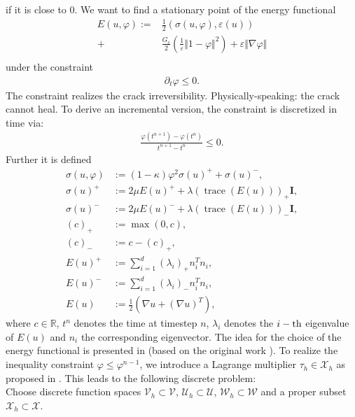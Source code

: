 if it is close to $0$.
We want to find a stationary point of the energy functional
\begin{align*}
E(u, \varphi):=& \frac{1}{2}(\sigma(u,\varphi),\varepsilon(u)) \\
+&\frac{G_c}{2}(\frac{1}{\varepsilon} \Vert 1 - \varphi \Vert^2)+\varepsilon \Vert \nabla \varphi  \Vert\\
\end{align*}
under the constraint 
\begin{align*}
\partial_t \varphi \leq 0.
 \end{align*}
The constraint realizes the crack irreversibility. Physically-speaking: the
crack cannot heal. To derive an incremental version, the constraint is discretized in time via:
\begin{align*}
 \frac{\varphi(t^{n+1})-\varphi(t^n)}{t^{n+1}-t^n} \leq 0.
\end{align*}
Further it is defined
\begin{align*}
\sigma(u,\varphi)&:= (1-\kappa)\varphi^2 \sigma(u)^+ + \sigma(u)^-,\\
\sigma(u)^+ &:= 2\mu E(u)^+ +\lambda (\operatorname{trace}(E(u)))_+ \textbf{I},\\
\sigma(u)^- &:= 2\mu E(u)^- +\lambda (\operatorname{trace}(E(u)))_- \textbf{I},\\
(c)_+ &:= \max(0, c), \\
(c)_- &:= c-(c)_+, \\
E(u)^+ &:= \sum_{i=1}^{d} (\lambda_i)_+ n_i^T n_i,\\
E(u)^- &:= \sum_{i=1}^{d} (\lambda_i)_- n_i^T n_i,\\
E(u)   &:= \frac{1}{2}(\nabla u +(\nabla u)^T),
\end{align*}
where $c \in \mathbb{R}$, $t^n$ denotes the time at timestep $n$, $\lambda_i$ denotes the $i-\rm{th}$ eigenvalue of $E(u)$ and $n_i$ the corresponding eigenvector.
The idea for the choice of the energy functional is presented
in \cite{MieHofWel2010} (based on the original work \cite{BourFraMar00,BourFraMar08,FraMar98}).
To realize the inequality constraint $\varphi 
\leq \varphi^{n-1}$, we introduce
a Lagrange multiplier $\tau_h \in \mathcal{X}_h$ as proposed in \cite[Section~4.1]{MangWickWollner:2020}.
This leads to the following discrete problem: \\
Choose discrete function spaces $\mathcal{V}_h \subset \mathcal{V}$, $\mathcal{U}_h \subset \mathcal{U}$, $\mathcal{W}_h \subset \mathcal{W}$ and a proper subset $\mathcal{X}_h \subset \mathcal{X}$.
